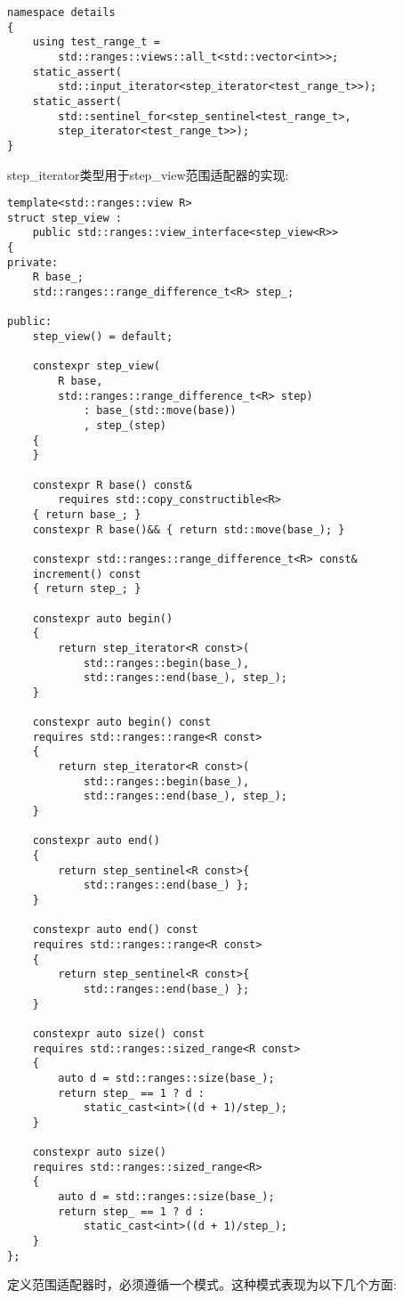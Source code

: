 \begin{lstlisting}[style=styleCXX]
namespace details
{
	using test_range_t =
		std::ranges::views::all_t<std::vector<int>>;
	static_assert(
		std::input_iterator<step_iterator<test_range_t>>);
	static_assert(
		std::sentinel_for<step_sentinel<test_range_t>,
		step_iterator<test_range_t>>);
}
\end{lstlisting}

step\_iterator类型用于step\_view范围适配器的实现:

\begin{lstlisting}[style=styleCXX]
template<std::ranges::view R>
struct step_view :
	public std::ranges::view_interface<step_view<R>>
{
private:
	R base_;
	std::ranges::range_difference_t<R> step_;
	
public:
	step_view() = default;
	
	constexpr step_view(
		R base,
		std::ranges::range_difference_t<R> step)
			: base_(std::move(base))
			, step_(step)
	{
	}

	constexpr R base() const&
		requires std::copy_constructible<R>
	{ return base_; }
	constexpr R base()&& { return std::move(base_); }
	
	constexpr std::ranges::range_difference_t<R> const&
	increment() const
	{ return step_; }
	
	constexpr auto begin()
	{
		return step_iterator<R const>(
			std::ranges::begin(base_),
			std::ranges::end(base_), step_);
	}

	constexpr auto begin() const
	requires std::ranges::range<R const>
	{
		return step_iterator<R const>(
			std::ranges::begin(base_),
			std::ranges::end(base_), step_);
	}

	constexpr auto end()
	{
		return step_sentinel<R const>{
			std::ranges::end(base_) };
	}

	constexpr auto end() const
	requires std::ranges::range<R const>
	{
		return step_sentinel<R const>{
			std::ranges::end(base_) };
	}

	constexpr auto size() const
	requires std::ranges::sized_range<R const>
	{
		auto d = std::ranges::size(base_);
		return step_ == 1 ? d :
			static_cast<int>((d + 1)/step_); 
	}
	
	constexpr auto size()
	requires std::ranges::sized_range<R>
	{
		auto d = std::ranges::size(base_);
		return step_ == 1 ? d :
			static_cast<int>((d + 1)/step_);
	}
};
\end{lstlisting}

定义范围适配器时，必须遵循一个模式。这种模式表现为以下几个方面:

